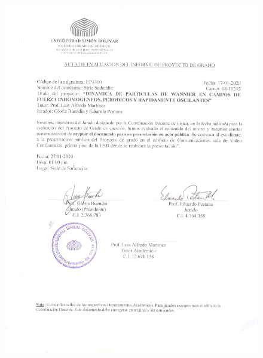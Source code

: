 \begin{figure}
    \centering
    \includegraphics[width=1\columnwidth]{imagenes/ActaevaluacioncontenidoSiria3.pdf}
\end{figure}

